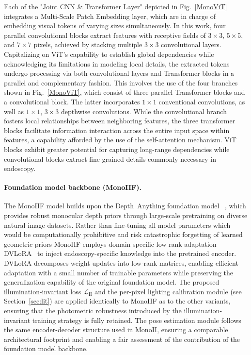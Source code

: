 \documentclass[a4paper,fleqn]{cas-dc}
\begin{document}
Each of the "Joint CNN \& Transformer Layer" depicted in Fig.~\ref{MonoViT} integrates a Multi-Scale Patch Embedding layer, which are in charge of embedding visual tokens of varying sizes simultaneously. In this work, four parallel convolutional blocks extract features with receptive fields of $3\times 3$, $5\times5$, and $7\times7$ pixels, achieved by stacking multiple $3\times3$ convolutional layers. Capitalizing on ViT's capability to establish global dependencies while acknowledging its limitations in modeling local details, the extracted tokens undergo processing via both convolutional layers and Transformer blocks in a parallel and complementary fashion. This involves the use of the four branches shown in Fig.~\ref{MonoViT}, which consist of three parallel Transformer blocks and a convolutional block. The latter incorporates $1\times1$ conventional convolutions, as well as $1\times1$, $3\times3$ depthwise convolutions. While the convolutional branch fosters local relationships between neighboring features, the three transformer blocks facilitate information interaction across the entire input space within features, a capability afforded by the use of the self-attention mechanism.
%
ViT blocks exhibit greater potential for capturing long-range dependencies while convolutional blocks extract fine-grained details commonly necessary in endoscopy.
%
\paragraph{Foundation model backbone (MonoIIF).}
The MonoIIF model builds upon the Depth~Anything foundation model ~\citep{yang2024depth}, which provides robust monocular depth priors through large-scale pretraining on diverse natural image datasets. Rather than fine-tuning all model parameters which would be computationally prohibitive and risk catastrophic forgetting of learned geometric priors MonoIIF employs domain-specific low-rank adaptation DVLoRA~\citep{cui2024endodac} to inject endoscopy-specific knowledge into the pretrained encoder. DVLoRA decomposes weight updates into low-rank matrices, enabling efficient adaptation with a small number of trainable parameters while preserving the generalization capability of the original foundation model. The proposed illumination-invariant loss $\mathcal{L}_\text{II}$ and the per-pixel lighting calibration module (see Section~\ref{sec:lit}) are applied identically to MonoIIF as to the other variants, ensuring that the photometric robustness introduced by the illumination-invariant training strategy is fully retained. The pose estimation module follows the same encoder-decoder structure used in MonoII, ensuring a comparable architectural footprint and enabling a fair assessment of the contribution of the foundation model backbone.
%
\end{document}
